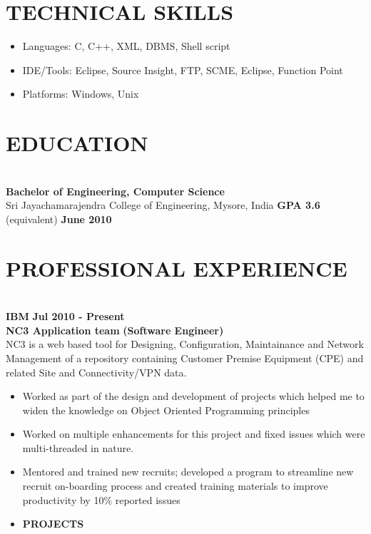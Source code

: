 \documentclass{system}
\begin{document}
\begin{resume}
\section {TECHNICAL SKILLS}
\hrulefill
   \begin{itemize} \itemsep -2pt %
   \item Languages: C, C++, XML, DBMS, Shell script
   \item IDE/Tools: Eclipse, Source Insight, FTP, SCME, Eclipse, Function Point
   \item Platforms: Windows, Unix
 \end{itemize}
\vspace{5pt}
 
\section{EDUCATION} 
\hrulefill\\
{\bfseries Bachelor of Engineering, Computer Science} \\ %
Sri Jayachamarajendra College of Engineering, Mysore, India
\hspace{0.2in}  {\bfseries GPA 3.6} (equivalent)
\hfill    {\bfseries June 2010}
  
\vspace{5pt}
\section{{PROFESSIONAL EXPERIENCE}} 
\hrulefill \\
{\bfseries IBM} \hfill         {\bfseries Jul 2010 - Present} \\
{\bfseries NC3 Application team}       \hfill   {\bfseries (Software
Engineer)}\\
 NC3 is a web based tool for Designing, Configuration, Maintainance and Network
 Management of a repository containing Customer Premise Equipment (CPE) and
 related Site and Connectivity/VPN data. 
   \begin{itemize} \itemsep 2pt %
   \item Worked as part of the design and development of projects which helped
   me to widen the knowledge on Object Oriented Programming principles
   \item Worked on multiple enhancements for this project and fixed issues
   which were multi-threaded in nature.
   \item  Mentored and trained new recruits; developed a program to streamline new
 recruit on-boarding process and created training materials to improve 
 productivity by 10\%
   reported issues
   \item {\bfseries PROJECTS}
    \begin{itemize} \itemsep 2pt


\end{itemize}
\end{itemize}
\end{resume}
\end{document}
